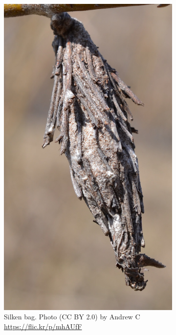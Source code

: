 \documentclass[letterpaper, 11pt]{article}
\begin{document}
\begin{figure}[ht!]
\begin{subfigure}[ht!]{0.15\textwidth}
        \includegraphics[width=\textwidth]{psychid2}
        \caption{Silken bag. Photo (CC BY 2.0) by Andrew C \url{https://flic.kr/p/mhAUfF}}
        \label{fig:psychid2}
    \end{subfigure}
    ~ %
    \begin{subfigure}[ht!]{0.35\textwidth}

\end{subfigure}
\end{figure}
\end{document}
